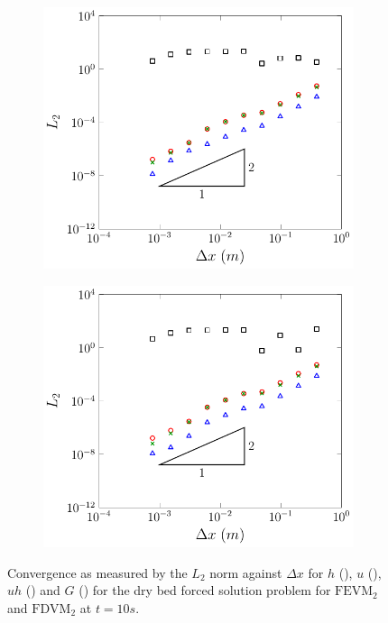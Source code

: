 \begin{figure}
	\centering
	\begin{subfigure}{0.5\textwidth}
		\includegraphics[width=\textwidth]{./chp5/figures/Forced/Dry/FEVML2.pdf}
	\end{subfigure}%
	\begin{subfigure}{0.5\textwidth}
		\includegraphics[width=\textwidth]{./chp5/figures/Forced/Dry/FDVML2.pdf}
	\end{subfigure}
	\caption{Convergence as measured by the $L_2$ norm against $\Delta x$ for $h$ (), $u$ (), $uh$ ({}) and $G$ () for the dry bed forced solution problem for $\text{FEVM}_2$ and $\text{FDVM}_2$ at $t=10s$.}
	\label{fig:ForcedSolDryL1}
\end{figure}

